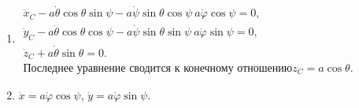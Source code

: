 \begin{enumerate}
\item $\begin{array}{ll}
	\dot{x}_C - a\dot{\theta}\cos{\theta}\sin{\psi} -
	a\dot{\psi}\sin{\theta}\cos{\psi} \ a\dot{\varphi}\cos{\psi} = 0,\\
	\dot{y}_C - a\dot{\theta}\cos{\theta}\cos{\psi} -
	a\dot{\psi}\sin{\theta}\sin{\psi} \ a\dot{\varphi}\sin{\psi} = 0,\\
	\dot{z}_C + a\dot{\theta}\sin{\theta} = 0.\\
	\mbox{Последнее уравнение сводится к конечному отношению} z_C = a\cos{\theta}.
	\end{array}$
\item $\dot{x} = a\dot{\varphi}\cos{\psi}$,
	$\dot{y} = a\dot{\varphi}\sin{\psi}$.
\end{enumerate}
